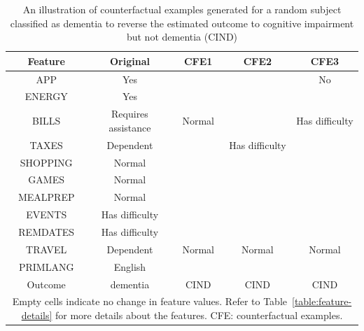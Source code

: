\begin{table}[H]
    \centering
    \caption{An illustration of counterfactual examples generated for a random subject classified as dementia to reverse the estimated outcome to cognitive impairment but not dementia (\acrshort{CIND})}
    \begin{tabular}{|c|c|c|c|c|}
    \hline
        \textbf{Feature} & \textbf{Original} & \textbf{CFE1} & \textbf{CFE2} & \textbf{CFE3} \\ \hline
        APP & Yes & ~ & ~ & No \\ \hline
        ENERGY & Yes & ~ & ~ & ~ \\ \hline
        BILLS & Requires assistance & Normal & ~ & Has difficulty \\ \hline
        TAXES & Dependent & ~ & Has difficulty & ~ \\ \hline
        SHOPPING & Normal & ~ & ~ & ~ \\ \hline
        GAMES & Normal & ~ & ~ & ~ \\ \hline
        MEALPREP & Normal & ~ & ~ & ~ \\ \hline
        EVENTS & Has difficulty & ~ & ~ & ~ \\ \hline
        REMDATES & Has difficulty & ~ & ~ & ~ \\ \hline
        TRAVEL & Dependent & Normal & Normal & Normal \\ \hline
        PRIMLANG & English & ~ & ~ & ~ \\ \hline
        Outcome & dementia & CIND & CIND & CIND \\ \hline
    \multicolumn{5}{p{350pt}}{\footnotesize Empty cells indicate no change in feature values. Refer to Table~\ref{table:feature-details} for more details about the features. CFE: counterfactual examples.}
    \end{tabular}
    \label{table:cfe-adni-task2-apdx}
\end{table}

